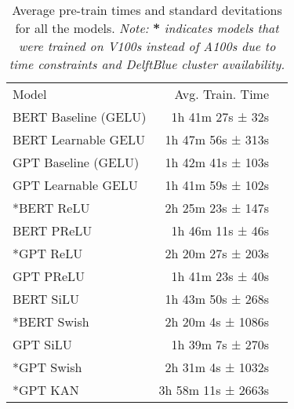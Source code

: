     \begin{table}[!htp]\centering
        \caption{Average pre-train times and standard devitations for all the models. \textit{Note:} \textbf{*} \textit{indicates models that were trained on V100s instead of A100s due to time constraints and DelftBlue cluster availability.}}
        \label{tab:average-times}
        \scriptsize
        \begin{tabular}{lrr}\toprule
        Model &Avg. Train. Time \\ \cmidrule{1-2}
        BERT Baseline (GELU) &1h 41m 27s ± 32s \\
        BERT Learnable GELU &1h 47m 56s ± 313s \\
        GPT Baseline (GELU) &1h 42m 41s ± 103s \\
        GPT Learnable GELU &1h 41m 59s ± 102s \\
        *BERT ReLU &2h 25m 23s ± 147s \\
        BERT PReLU &1h 46m 11s ± 46s \\
        *GPT ReLU &2h 20m 27s ± 203s \\
        GPT PReLU &1h 41m 23s ± 40s \\
        BERT SiLU &1h 43m 50s ± 268s \\
        *BERT Swish &2h 20m 4s ± 1086s \\
        GPT SiLU &1h 39m 7s ± 270s \\
        *GPT Swish &2h 31m 4s ± 1032s \\
        *GPT KAN &3h 58m 11s ± 2663s \\
        \bottomrule
        \end{tabular}
        \end{table}


